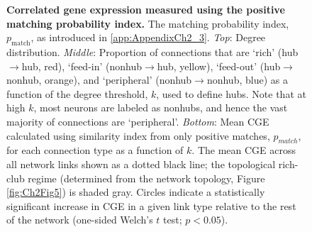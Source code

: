 \begin{figure}[h!]
 \caption{{\bf Correlated gene expression measured using the positive matching probability index.} The matching probability index, $p_\mathrm{match}$, as introduced in \ref{app:AppendixCh2_3}.
\emph{Top}: Degree distribution.
\emph{Middle}: Proportion of connections that are `rich' (hub$\rightarrow$hub, red), `feed-in' (nonhub$\rightarrow$hub, yellow), `feed-out' (hub$\rightarrow$nonhub, orange), and `peripheral' (nonhub$\rightarrow$nonhub, blue) as a function of the degree threshold, $k$, used to define hubs.
Note that at high $k$, most neurons are labeled as nonhubs, and hence the vast majority of connections are `peripheral'.
\emph{Bottom}: Mean CGE calculated using similarity index from only positive matches, $p_{match}$, for each connection type as a function of $k$.
The mean CGE across all network links shown as a dotted black line; the topological rich-club regime (determined from the network topology, Figure \ref{fig:Ch2Fig5}) is shaded gray.
Circles indicate a statistically significant increase in CGE in a given link type relative to the rest of the network (one-sided Welch's $t$ test; $p < 0.05$).}
\label{fig:Ch2S3_Fig}
\end{figure}




